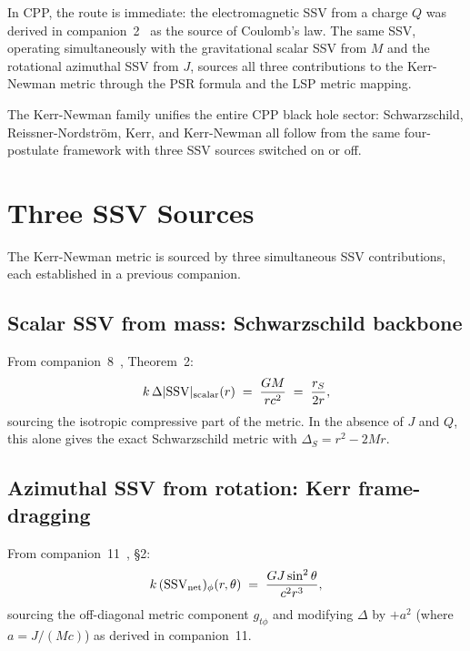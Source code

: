 \documentclass[12pt]{article}
\newcommand{\SSV}{\mathrm{SSV}}
\newcommand{\Dlt}{\Delta}
\begin{document}
In CPP, the route is immediate: the electromagnetic SSV from a charge
$Q$ was derived in companion~2~\cite{c2} as the source of Coulomb's
law.  The same SSV, operating simultaneously with the gravitational
scalar SSV from $M$ and the rotational azimuthal SSV from $J$, sources
all three contributions to the Kerr-Newman metric through the PSR
formula and the LSP metric mapping.

The Kerr-Newman family unifies the entire CPP black hole sector:
Schwarzschild, Reissner-Nordström, Kerr, and Kerr-Newman all follow
from the same four-postulate framework with three SSV sources switched
on or off.

\section{Three SSV Sources}
\label{sec:sources}

The Kerr-Newman metric is sourced by three simultaneous SSV
contributions, each established in a previous companion.

\subsection{Scalar SSV from mass: Schwarzschild backbone}

From companion~8~\cite{c8}, Theorem~2:
\begin{equation}
  k\,\Delta|\SSV|_{\rm scalar}(r) \;=\; \frac{GM}{rc^2}
  \;=\; \frac{r_S}{2r},
  \label{eq:ssv_scalar}
\end{equation}
sourcing the isotropic compressive part of the metric.  In the
absence of $J$ and $Q$, this alone gives the exact Schwarzschild
metric with $\Dlt_S = r^2 - 2Mr$.

\subsection{Azimuthal SSV from rotation: Kerr frame-dragging}

From companion~11~\cite{c11}, §2:
\begin{equation}
  k\,(\SSV_{\rm net})_\phi(r,\theta) \;=\;
  \frac{GJ\sin^2\theta}{c^2 r^3},
  \label{eq:ssv_phi}
\end{equation}
sourcing the off-diagonal metric component $g_{t\phi}$ and modifying
$\Dlt$ by $+a^2$ (where $a = J/(Mc)$) as derived in companion~11.
\end{document}
